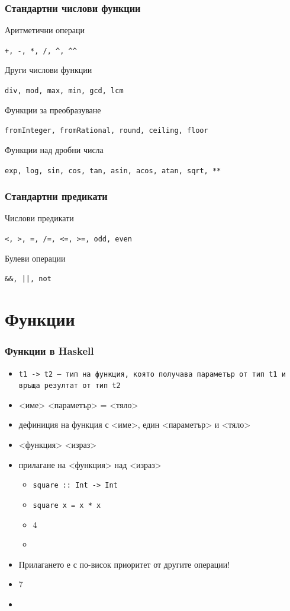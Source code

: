 \documentclass{beamer}
\begin{document}
\begin{frame}
  \frametitle{Стандартни числови функции}

  Аритметични операци

  \tt{+}, \tt{-}, \tt{*}, \tt{/}, \tt{\^{}}, \tt{\^{}\^{}}

  \vspace{1em}
  Други числови функции

  \tt{div}, \tt{mod}, \tt{max}, \tt{min}, \tt{gcd}, \tt{lcm}

  \vspace{1em}
  Функции за преобразуване

  \tt{fromInteger}, \tt{fromRational}, \tt{round}, \tt{ceiling}, \tt{floor}

  \vspace{1em}
  Функции над дробни числа

  \tt{exp}, \tt{log}, \tt{sin}, \tt{cos}, \tt{tan}, \tt{asin}, \tt{acos}, \tt{atan}, \tt{sqrt}, \tt{**}
\end{frame}

\begin{frame}
  \frametitle{Стандартни предикати}

  Числови предикати

  \tt{<}, \tt{>}, \tt{=}, \tt{/=}, \tt{<=}, \tt{>=}, \tt{odd}, \tt{even}

  \vspace{1em}
  Булеви операции

  \tt{\&\&}, \tt{||}, \tt{not}
\end{frame}

\section{Функции}

\begin{frame}
  \frametitle{Функции в Haskell}
  \begin{itemize}[<+->]
  \item \tt{t1 -> t2} --- тип на функция, която получава параметър от тип \tt{t1} и връща резултат от тип \tt{t2}
  \item {}<име> <параметър> \tta= <тяло>
  \item дефиниция на функция с <име>, един <параметър> и <тяло>
  \item {}<функция> <израз>
  \item прилагане на <функция> над <израз>
    \begin{itemize}[<.->]
    \item \tt{square :: Int -> Int}
    \item \tt{square x = x * x}
    \item {}4
    \item {}
    \end{itemize}
  \item \alert{Прилагането е с по-висок приоритет от другите операции!}
  \item {}7
  \item {}
  \end{itemize}
\end{frame}
\end{document}

